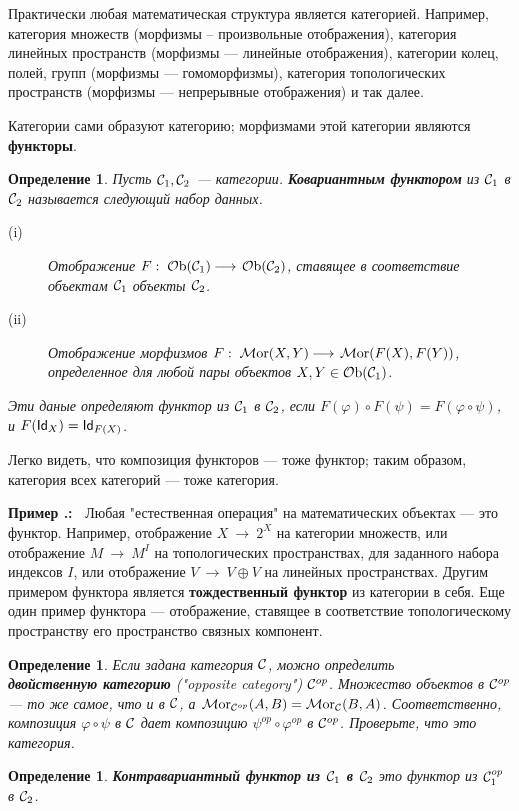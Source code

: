 \documentclass[12pt]{book}
\newcommand{\arrow}{{\:\longrightarrow\:}}
\renewcommand{\phi}{\varphi}
\def\Id{{\operatorname{\sf Id}}}
\newcommand{\Ob}{\operatorname{{\cal O}b}}
\newcommand{\Mor}{\operatorname{{\cal M}or}}
\newcommand{\cac}{{\cal C}}
\theoremstyle{upshape}
\theoremstyle{generic}
\newtheorem{opredelenie}[teorema]{Определение}
\def\еза{\end{remark}}
\theoremstyle{upshapenonumber}
\newcommand{\следствие}{%
     \refstepcounter{teorema}
     {\noindent\bf Следствие \thechapter.\arabic{teorema}:\ }}
\newcommand{\пример}{%
     \refstepcounter{teorema}
     {\noindent\bf Пример \thechapter.\arabic{teorema}:\ }}
\newcommand{\лемма}{%
     \refstepcounter{teorema}
     {\noindent\bf Лемма \thechapter.\arabic{teorema}:\ }}
\newcommand{\теорема}{%
     \refstepcounter{teorema}
     {\noindent\bf Теорема \thechapter.\arabic{teorema}:\ }}
\newcommand{\утверждение}{%
     \refstepcounter{teorema}
     {\noindent\bf Утверждение \thechapter.\arabic{teorema}:\ }}
\def\хфилл{\hfill}
\def\бф{\bf}
\def\ем{\em}
\def\ез{\end{zadacha}}
\def\еу{\end{ukazanie}}
\def\определение{\begin{opredelenie}}
\def\ео{\end{opredelenie}}
\def\енум{\begin{enumerate}}
\def\ее{\end{enumerate}}
\begin{document}
Практически любая математическая структура является
категорией. Например, категория множеств (морфизмы --
произвольные отображения), категория линейных пространств 
(морфизмы --- линейные отображения), категории колец,
полей, групп (морфизмы --- гомоморфизмы), категория
топологических пространств (морфизмы --- непрерывные
отображения) и так далее. 

Категории сами образуют категорию; морфизмами
этой категории являются {\бф функторы}.

\определение
Пусть $\cac_1, \cac_2$ --- категории. {\бф Ковариантным функтором}
из $\cac_1$ в $\cac_2$ называется следующий набор данных.
\begin{description}
\item[(i)] Отображение $F:\; \Ob(\cac_1) \arrow \Ob(\cac_2)$,
ставящее в соответствие объектам $\cac_1$ объекты $\cac_2$.
\item[(ii)] Отображение морфизмов $F:\; \Mor(X,Y) \arrow \Mor(F(X), F(Y))$,
определенное для любой пары объектов $X, Y \in \Ob(\cac_1)$.
\end{description}
Эти даные {\ем определяют функтор
из $\cac_1$ в $\cac_2$}, если $F(\phi) \circ F(\psi) =
F(\phi\circ\psi)$, и $F(\Id_X) = \Id_{F(X)}$.
\ео

Легко видеть, что композиция функторов --- тоже функтор;
таким образом, категория всех категорий --- тоже категория.

\хфилл

\пример
Любая "естественная операция" на математических объектах --- это
функтор. Например, отображение $X \arrow 2^X$ на категории
множеств, или отображение $M \arrow M^I$ на топологических
пространствах, для заданного набора индексов
$I$, или отображение $V \arrow V \oplus V$
на линейных пространствах. Другим примером функтора
является {\бф тождественный функтор} из категории
в себя. Еще один пример функтора --- отображение,
ставящее в соответствие топологическому пространству
его пространство связных компонент. 

\определение
Если задана категория $\cac$, можно определить \\ {\бф двойственную
категорию} ("opposite category") 
$\cac^{op}$. Множество объектов в $\cac^{op}$ --- то же самое,
что и в $\cac$, а $\Mor_{\cac^{op}}(A,B)= \Mor_{\cac}(B,A)$.
Соответственно, композиция $\phi\circ \psi$ в $\cac$ дает
композицию $\psi^{op}\circ \phi^{op}$ в $\cac^{op}$.
Проверьте, что это категория.
\ео

\определение
{\бф Контравариантный функтор из $\cac_1$ в $\cac_2$} 
это функтор из $\cac_1^{op}$ в $\cac_2$.
\ео
\end{document}
